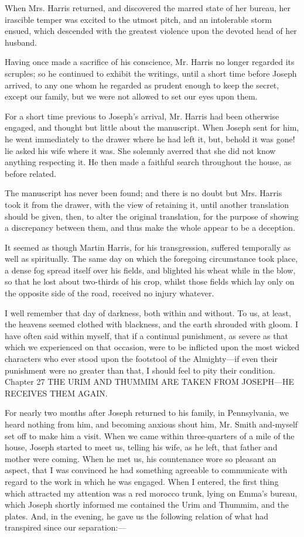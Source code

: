 		When Mrs. Harris returned, and discovered the marred state of her bureau, her irascible temper was excited to the utmost pitch, and an intolerable storm ensued, which descended with the greatest violence upon the devoted head of her husband.

		Having once made a sacrifice of his conscience, Mr. Harris no longer regarded its scruples; so he continued to exhibit the writings, until a short time before Joseph arrived, to any one whom he regarded as prudent enough to keep the secret, except our family, but we were not allowed to set our eyes upon them.

		For a short time previous to Joseph's arrival, Mr. Harris had been otherwise engaged, and thought but little about the manuscript. When Joseph sent for him, he went immediately to the drawer where he had left it, but, behold it was gone! lie asked his wife where it was. She solemnly averred that she did not know anything respecting it. He then made a faithful search throughout the house, as before related.

		The manuscript has never been found; and there is no doubt but Mrs. Harris took it from the drawer, with the view of retaining it, until another translation should be given, then, to alter the original translation, for the purpose of showing a discrepancy between them, and thus make the whole appear to be a deception.

		It seemed as though Martin Harris, for his transgression, suffered temporally as well as spiritually. The same day on which the foregoing circumstance took place, a dense fog spread itself over his fields, and blighted his wheat while in the blow, so that he lost about two-thirds of his crop, whilst those fields which lay only on the opposite side of the road, received no injury whatever.

		I well remember that day of darkness, both within and without. To us, at least, the heavens seemed clothed with blackness, and the earth shrouded with gloom. I have often said within myself, that if a continual punishment, as severe as that which we experienced on that occasion, were to be inflicted upon the most wicked characters who ever stood upon the footstool of the Almighty---if even their punishment were no greater than that, I should feel to pity their condition.
		Chapter 27
		THE URIM AND THUMMIM ARE TAKEN FROM JOSEPH---HE RECEIVES THEM AGAIN.

		For nearly two months after Joseph returned to his family, in Pennsylvania, we heard nothing from him, and becoming anxious shout him, Mr. Smith and-myself set off to make him a visit. When we came within three-quarters of a mile of the house, Joseph started to meet us, telling his wife, as he left, that father and mother were coming. When he met us, his countenance wore so pleasant an aspect, that I was convinced he had something agreeable to communicate with regard to the work in which he was engaged. When I entered, the first thing which attracted my attention was a red morocco trunk, lying on Emma's bureau, which Joseph shortly informed me contained the Urim and Thummim, and the plates. And, in the evening, he gave us the following relation of what had transpired since our separation:---

